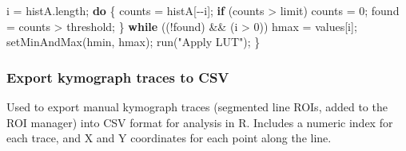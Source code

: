 \documentclass[
  12pt,
  a4paper,
]{book}
\newenvironment{Shaded}{}{}
\newcommand{\ControlFlowTok}[1]{\textcolor[rgb]{0.00,0.44,0.13}{\textbf{#1}}}
\newcommand{\DecValTok}[1]{\textcolor[rgb]{0.25,0.63,0.44}{#1}}
\newcommand{\NormalTok}[1]{#1}
\newcommand{\OperatorTok}[1]{\textcolor[rgb]{0.40,0.40,0.40}{#1}}
\newcommand{\StringTok}[1]{\textcolor[rgb]{0.25,0.44,0.63}{#1}}
\begin{document}
\begin{Shaded}
\begin{Highlighting}[]
\NormalTok{    i }\OperatorTok{=}\NormalTok{ histA}\OperatorTok{.}\NormalTok{length}\OperatorTok{;} 
    \ControlFlowTok{do} \OperatorTok{\{} 
\NormalTok{            counts }\OperatorTok{=}\NormalTok{ histA}\OperatorTok{[{-}{-}}\NormalTok{i}\OperatorTok{];} 
            \ControlFlowTok{if} \OperatorTok{(}\NormalTok{counts }\OperatorTok{\textgreater{}}\NormalTok{ limit}\OperatorTok{)}\NormalTok{ counts }\OperatorTok{=} \DecValTok{0}\OperatorTok{;} 
\NormalTok{            found }\OperatorTok{=}\NormalTok{ counts }\OperatorTok{\textgreater{}}\NormalTok{ threshold}\OperatorTok{;} 
    \OperatorTok{\}} \ControlFlowTok{while} \OperatorTok{((!}\NormalTok{found}\OperatorTok{)} \OperatorTok{\&\&} \OperatorTok{(}\NormalTok{i }\OperatorTok{\textgreater{}} \DecValTok{0}\OperatorTok{))} 
\NormalTok{    hmax }\OperatorTok{=}\NormalTok{ values}\OperatorTok{[}\NormalTok{i}\OperatorTok{];} 
\NormalTok{    setMinAndMax}\OperatorTok{(}\NormalTok{hmin}\OperatorTok{,}\NormalTok{ hmax}\OperatorTok{);} 
\NormalTok{    run}\OperatorTok{(}\StringTok{"Apply LUT"}\OperatorTok{);} 
\OperatorTok{\}}
\end{Highlighting}
\end{Shaded}

\subsubsection{Export kymograph traces to CSV}\label{kymo-export}

Used to export manual kymograph traces (segmented line ROIs, added to the ROI manager) into CSV format for analysis in R. Includes a numeric index for each trace, and X and Y coordinates for each point along the line.
\end{document}
